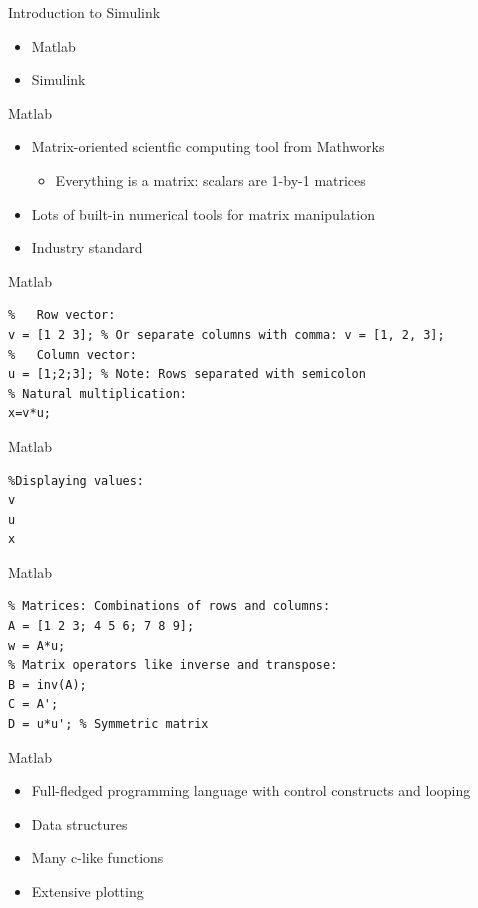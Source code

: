 \begin{frame}
Introduction to Simulink
\begin{itemize}
  \item Matlab
  \item Simulink
\end{itemize} 
\end{frame}

\begin{frame}
Matlab
\begin{itemize}
  \item Matrix-oriented scientfic computing tool from Mathworks
	\begin{itemize}
	  \item Everything is a matrix: scalars are 1-by-1 matrices
	\end{itemize}
  \item Lots of built-in numerical tools for matrix manipulation
  \item Industry standard
\end{itemize} 
\end{frame}

\begin{frame}[fragile]
Matlab
\begin{verbatim}
%   Row vector:
v = [1 2 3]; % Or separate columns with comma: v = [1, 2, 3];
%   Column vector:
u = [1;2;3]; % Note: Rows separated with semicolon
% Natural multiplication:
x=v*u;
\end{verbatim}

\end{frame}

\begin{frame}[fragile]
Matlab
\begin{verbatim}
%Displaying values:
v
u
x
\end{verbatim}
\end{frame}

\begin{frame}[fragile]
Matlab
\begin{verbatim}
% Matrices: Combinations of rows and columns:
A = [1 2 3; 4 5 6; 7 8 9];
w = A*u;
% Matrix operators like inverse and transpose:
B = inv(A);
C = A';
D = u*u'; % Symmetric matrix
\end{verbatim}
\end{frame}

\begin{frame}
Matlab
\begin{itemize}
  \item Full-fledged programming language with control constructs and looping
  \item Data structures
  \item Many c-like functions
  \item Extensive plotting 
\end{itemize} 
\end{frame}

